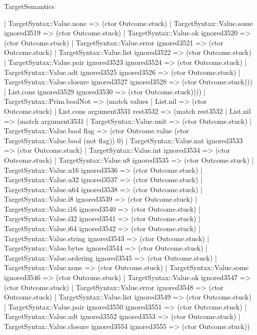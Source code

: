 \begin{lexlean}{TargetSemantics}
\begin{semanticmodule}
{            | TargetSyntax::Value.none => (ctor Outcome.stuck)
            | TargetSyntax::Value.some ignored3519 => (ctor Outcome.stuck)
            | TargetSyntax::Value.ok ignored3520 => (ctor Outcome.stuck)
            | TargetSyntax::Value.error ignored3521 => (ctor Outcome.stuck)
            | TargetSyntax::Value.list ignored3522 => (ctor Outcome.stuck)
            | TargetSyntax::Value.pair ignored3523 ignored3524 => (ctor Outcome.stuck)
            | TargetSyntax::Value.adt ignored3525 ignored3526 => (ctor Outcome.stuck)
            | TargetSyntax::Value.closure ignored3527 ignored3528 => (ctor Outcome.stuck)))
          | List.cons ignored3529 ignored3530 => (ctor Outcome.stuck))))
    | TargetSyntax::Prim.boolNot => (match values
      | List.nil => (ctor Outcome.stuck)
      | List.cons argument3531 rest3532 => (match rest3532
        | List.nil => (match argument3531
          | TargetSyntax::Value.unit => (ctor Outcome.stuck)
          | TargetSyntax::Value.bool flag => (ctor Outcome.value (ctor TargetSyntax::Value.bool (not flag)) 0)
          | TargetSyntax::Value.nat ignored3533 => (ctor Outcome.stuck)
          | TargetSyntax::Value.int ignored3534 => (ctor Outcome.stuck)
          | TargetSyntax::Value.u8 ignored3535 => (ctor Outcome.stuck)
          | TargetSyntax::Value.u16 ignored3536 => (ctor Outcome.stuck)
          | TargetSyntax::Value.u32 ignored3537 => (ctor Outcome.stuck)
          | TargetSyntax::Value.u64 ignored3538 => (ctor Outcome.stuck)
          | TargetSyntax::Value.i8 ignored3539 => (ctor Outcome.stuck)
          | TargetSyntax::Value.i16 ignored3540 => (ctor Outcome.stuck)
          | TargetSyntax::Value.i32 ignored3541 => (ctor Outcome.stuck)
          | TargetSyntax::Value.i64 ignored3542 => (ctor Outcome.stuck)
          | TargetSyntax::Value.string ignored3543 => (ctor Outcome.stuck)
          | TargetSyntax::Value.bytes ignored3544 => (ctor Outcome.stuck)
          | TargetSyntax::Value.ordering ignored3545 => (ctor Outcome.stuck)
          | TargetSyntax::Value.none => (ctor Outcome.stuck)
          | TargetSyntax::Value.some ignored3546 => (ctor Outcome.stuck)
          | TargetSyntax::Value.ok ignored3547 => (ctor Outcome.stuck)
          | TargetSyntax::Value.error ignored3548 => (ctor Outcome.stuck)
          | TargetSyntax::Value.list ignored3549 => (ctor Outcome.stuck)
          | TargetSyntax::Value.pair ignored3550 ignored3551 => (ctor Outcome.stuck)
          | TargetSyntax::Value.adt ignored3552 ignored3553 => (ctor Outcome.stuck)
          | TargetSyntax::Value.closure ignored3554 ignored3555 => (ctor Outcome.stuck))
}
\end{semanticmodule}
\end{lexlean}
